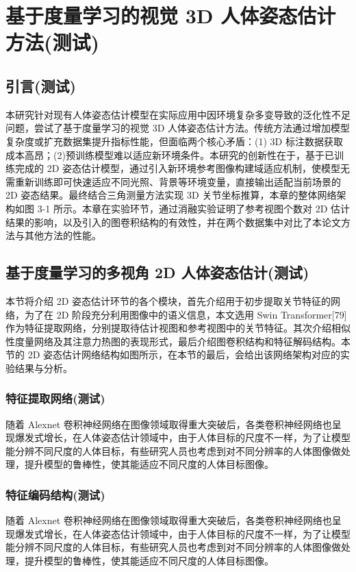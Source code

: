 
\chapter{基于度量学习的视觉 3D 人体姿态估计方法(测试)}

\section{引言(测试)}
本研究针对现有人体姿态估计模型在实际应用中因环境复杂多变导致的泛化性不足问题，尝试了基于度量学习的视觉 3D 人体姿态估计方法。传统方法通过增加模型复杂度或扩充数据集提升指标性能，但面临两个核心矛盾：(1) 3D 标注数据获取成本高昂；(2)预训练模型难以适应新环境条件。本研究的创新性在于，基于已训练完成的 2D 姿态估计模型，通过引入新环境参考图像构建域适应机制，使模型无需重新训练即可快速适应不同光照、背景等环境变量，直接输出适配当前场景的 2D 姿态结果。最终结合三角测量方法实现 3D 关节坐标推算，本章的整体网络架构如图 3-1 所示。本章在实验环节，通过消融实验证明了参考视图个数对 2D 估计结果的影响，以及引入的图卷积结构的有效性，并在两个数据集中对比了本论文方法与其他方法的性能。

\section{基于度量学习的多视角 2D 人体姿态估计(测试)}
本节将介绍 2D 姿态估计环节的各个模块，首先介绍用于初步提取关节特征的网络，为了在 2D 阶段充分利用图像中的语义信息，本文选用 Swin Transformer[79]作为特征提取网络，分别提取待估计视图和参考视图中的关节特征。其次介绍相似性度量网络及其注意力热图的表现形式，最后介绍图卷积结构和特征解码结构。本节的 2D 姿态估计网络结构如图所示，在本节的最后，会给出该网络架构对应的实验结果与分析。

\subsection{特征提取网络(测试)}
随着 Alexnet 卷积神经网络在图像领域取得重大突破后，各类卷积神经网络也呈现爆发式增长，在人体姿态估计领域中，由于人体目标的尺度不一样，为了让模型能分辨不同尺度的人体目标，有些研究人员也考虑到对不同分辨率的人体图像做处理，提升模型的鲁棒性，使其能适应不同尺度的人体目标图像。

\subsection{特征编码结构(测试)}
随着 Alexnet 卷积神经网络在图像领域取得重大突破后，各类卷积神经网络也呈现爆发式增长，在人体姿态估计领域中，由于人体目标的尺度不一样，为了让模型能分辨不同尺度的人体目标，有些研究人员也考虑到对不同分辨率的人体图像做处理，提升模型的鲁棒性，使其能适应不同尺度的人体目标图像。

